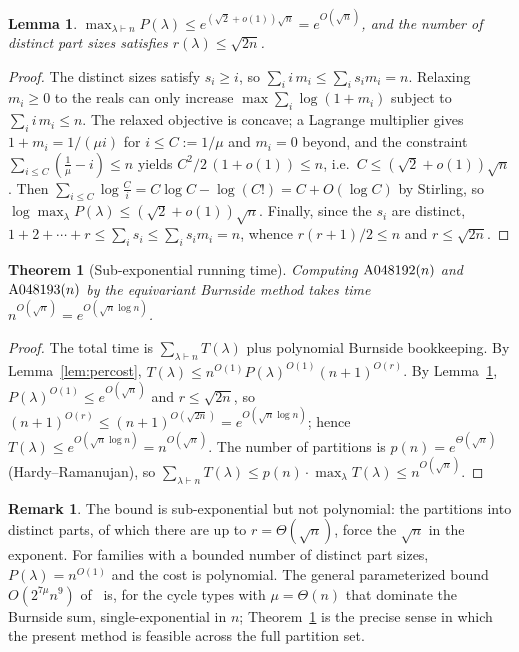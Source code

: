\documentclass[11pt]{article}
\theoremstyle{plain}
\newtheorem{theorem}{Theorem}
\newtheorem{lemma}{Lemma}
\theoremstyle{definition}
\newtheorem{remark}{Remark}
\begin{document}
\begin{lemma}\label{lem:maxprod}
$\displaystyle\max_{\lambda\vdash n}P(\lambda)\le e^{(\sqrt2+o(1))\sqrt n}=e^{O(\sqrt n)}$, and the
number of distinct part sizes satisfies $r(\lambda)\le\sqrt{2n}$.
\end{lemma}

\begin{proof}
The distinct sizes satisfy $s_i\ge i$, so $\sum_i i\,m_i\le\sum_i s_i m_i=n$. Relaxing $m_i\ge0$ to
the reals can only increase $\max\sum_i\log(1+m_i)$ subject to $\sum_i i\,m_i\le n$. The relaxed
objective is concave; a Lagrange multiplier gives $1+m_i=1/(\mu i)$ for $i\le C:=1/\mu$ and $m_i=0$
beyond, and the constraint $\sum_{i\le C}(\tfrac1\mu-i)\le n$ yields $C^2/2\,(1+o(1))\le n$, i.e.\
$C\le(\sqrt2+o(1))\sqrt n$. Then $\sum_{i\le C}\log\frac{C}{i}=C\log C-\log(C!)=C+O(\log C)$ by
Stirling, so $\log\max_\lambda P(\lambda)\le(\sqrt2+o(1))\sqrt n$. Finally, since the $s_i$ are
distinct, $1+2+\cdots+r\le\sum_i s_i\le\sum_i s_i m_i=n$, whence $r(r+1)/2\le n$ and $r\le\sqrt{2n}$.
\end{proof}

\begin{theorem}[Sub-exponential running time]\label{thm:time}
Computing $\textup{A048192}(n)$ and $\textup{A048193}(n)$ by the equivariant Burnside method takes
time $n^{O(\sqrt n)}=e^{O(\sqrt n\log n)}$.
\end{theorem}

\begin{proof}
The total time is $\sum_{\lambda\vdash n}T(\lambda)$ plus polynomial Burnside bookkeeping. By
Lemma~\ref{lem:percost}, $T(\lambda)\le n^{O(1)}P(\lambda)^{O(1)}(n+1)^{O(r)}$. By
Lemma~\ref{lem:maxprod}, $P(\lambda)^{O(1)}\le e^{O(\sqrt n)}$ and $r\le\sqrt{2n}$, so
$(n+1)^{O(r)}\le(n+1)^{O(\sqrt{2n})}=e^{O(\sqrt n\log n)}$; hence $T(\lambda)\le e^{O(\sqrt n\log n)}=
n^{O(\sqrt n)}$. The number of partitions is $p(n)=e^{\Theta(\sqrt n)}$ (Hardy--Ramanujan), so
$\sum_{\lambda\vdash n}T(\lambda)\le p(n)\cdot\max_\lambda T(\lambda)\le n^{O(\sqrt n)}$.
\end{proof}

\begin{remark}
The bound is sub-exponential but not polynomial: the partitions into distinct parts, of which there
are up to $r=\Theta(\sqrt n)$, force the $\sqrt n$ in the exponent. For families with a bounded
number of distinct part sizes, $P(\lambda)=n^{O(1)}$ and the cost is polynomial. The general
parameterized bound $O(2^{7\mu}n^9)$ of~\cite{HLV2025} is, for the cycle types with $\mu=\Theta(n)$
that dominate the Burnside sum, single-exponential in $n$; Theorem~\ref{thm:time} is the precise
sense in which the present method is feasible across the full partition set.
\end{remark}
\end{document}
